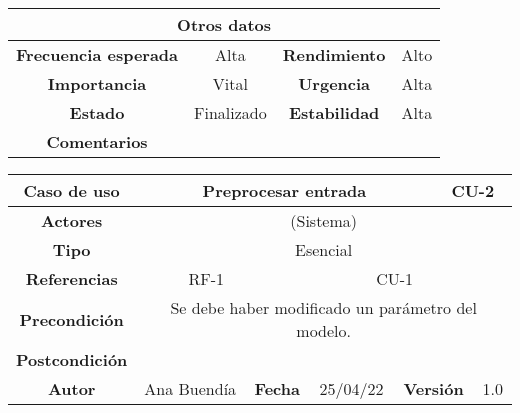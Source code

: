 \begin{table}[!h]
\begin{tabular}{|c|c|c|c|}
\hline
\multicolumn{4}{|c|}{\cellcolor{cyan} \textbf{Otros datos}} \\
\hline
 \cellcolor{cyan} \textbf{Frecuencia esperada}             &     Alta          &    \cellcolor{cyan} \textbf{Rendimiento}          &      Alto        \\
\hline
 \cellcolor{cyan} \textbf{Importancia}             &      Vital         &     \cellcolor{cyan} \textbf{Urgencia}         &      Alta        \\
\hline
 \cellcolor{cyan} \textbf{Estado}             &      Finalizado         &    \cellcolor{cyan} \textbf{Estabilidad}          &     Alta         \\
\hline
 \cellcolor{cyan} \textbf{Comentarios}        &  \multicolumn{3}{|c|}{} \\
\hline
\end{tabular}
\end{table}





\clearpage

\begin{table}[!h]
\begin{tabular}{|c|c|c|c|c|c|c|c|}
\hline
\rowcolor{cyan} \textbf{Caso de uso} & \multicolumn{5}{|c|}{Preprocesar entrada} & \multicolumn{2}{|c|}{CU-2} \\
\hline
\cellcolor{cyan} \textbf{Actores}              & \multicolumn{7}{|c|}{(Sistema)}           \\
\hline
\cellcolor{cyan} \textbf{Tipo}                 & \multicolumn{7}{|c|}{Esencial}             \\
\hline
\cellcolor{cyan} \textbf{Referencias}          & \multicolumn{2}{|c|}{RF-1}           & \multicolumn{5}{|c|}{CU-1}\\
\hline
\cellcolor{cyan} \textbf{Precondición}         & \multicolumn{7}{|c|}{Se debe haber modificado un parámetro del modelo.}             \\
\hline
\cellcolor{cyan} \textbf{Postcondición}        & \multicolumn{7}{|c|}{}              \\
\hline
\cellcolor{cyan} \textbf{Autor}                &   Ana Buendía   & \multicolumn{2}{|c|}{\cellcolor{cyan} \textbf{Fecha}} &  25/04/22   & \multicolumn{2}{|c|}{\cellcolor{cyan} \textbf{Versión}} & 1.0  \\
\hline
\end{tabular}
\end{table}


